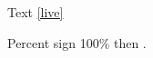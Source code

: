 \documentclass{article}
\begin{document}
Text \ref{live} %

\makeatletter \label{c:8} \makeatother
Percent sign 100\% then \cite{live}.
\end{document}
